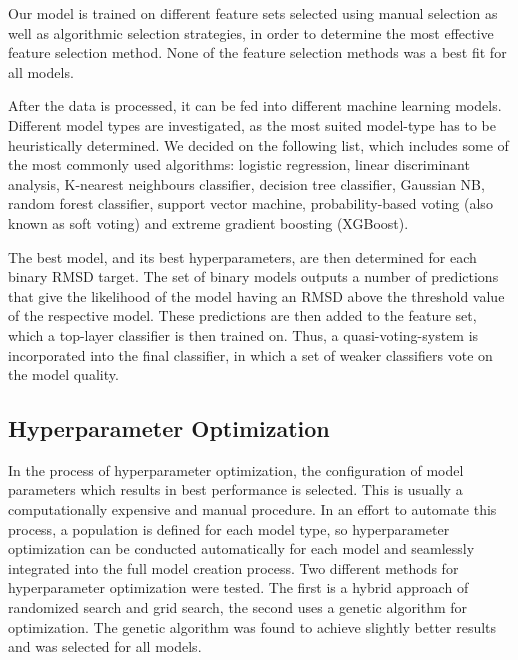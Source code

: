 \documentclass[preprint,12pt]{elsarticle}
\begin{document}
Our model is trained on different feature sets selected using manual selection as well as algorithmic selection strategies, in order to determine the most effective feature selection method. None of the feature selection methods was a best fit for all models.

After the data is processed, it can be fed into different machine learning models. Different model types are investigated, as the most suited model-type has to be heuristically determined. We decided on the following list, which includes some of the most commonly used algorithms: logistic regression, linear discriminant analysis, K-nearest neighbours classifier, decision tree classifier, Gaussian NB, random forest classifier, support vector machine, probability-based voting (also known as soft voting) and extreme gradient boosting (XGBoost)\cite{Chen2016}. 

The best model, and its best hyperparameters, are then determined for each binary RMSD target. The set of binary models outputs a number of predictions that give the likelihood of the model having an RMSD above the threshold value of the respective model. These predictions are then added to the feature set, which a top-layer classifier is then trained on. Thus, a quasi-voting-system is incorporated into the final classifier, in which a set of weaker classifiers vote on the model quality.  

\subsection{Hyperparameter Optimization}
\label{sec:sample2}
In the process of hyperparameter optimization, the configuration of model parameters which results in best performance is selected. This is usually a computationally expensive and manual procedure.
In an effort to automate this process, a population is defined for each model type, so hyperparameter optimization can be conducted automatically for each model and seamlessly integrated into the full model creation process. Two different methods for hyperparameter optimization were tested. The first is a hybrid approach of randomized search and grid search, the second uses a genetic algorithm for optimization. The genetic algorithm was found to achieve slightly better results and was selected for all models.
\end{document}
